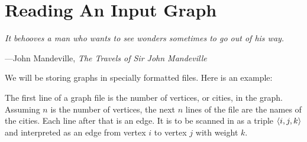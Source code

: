 \section{Reading An Input Graph}

\textwidth
\epigraph{\emph{It behooves a man who
wants to see wonders sometimes to go out of his way.}}{---John
Mandeville, \emph{The Travels of Sir John Mandeville}}

\noindent
We will be storing graphs in specially formatted files. Here is an
example:


The first line of a graph file is the number of vertices, or cities, in
the graph. Assuming $n$ is the number of vertices, the next $n$ lines
of the file are the names of the cities. Each line after that is an
edge. It is to be scanned in as a triple $$ and
interpreted as an edge from vertex $i$ to vertex $j$ with weight $k$.
